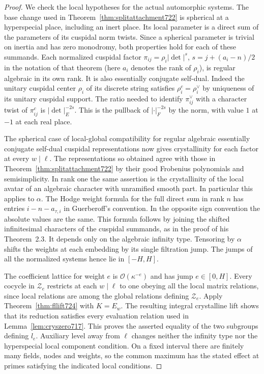 \documentclass[a4paper,11pt]{article}
\theoremstyle{definition}
\theoremstyle{remark}
\numberwithin{equation}{section}
\begin{document}
\begin{proof}
We check the local hypotheses for the actual automorphic systems.
The base change used in Theorem~\ref{thm:splitattachment722} is
spherical at a hyperspecial place, including an inert place.
Its local parameter is a direct sum of the parameters of its cuspidal
norm twists. Since a spherical parameter is trivial on inertia and
has zero monodromy, both properties hold for each of these summands.
Each normalized cuspidal factor
\(\pi_{ij}=\rho_i|\det|^{s}\), \(s=j+(a_i-n)/2\) in the notation of
that theorem (here \(a_i\) denotes the rank of \(\rho_i\)), is regular
algebraic in its own rank. It is also essentially conjugate self-dual.
Indeed the unitary cuspidal center \(\rho_i\) of its discrete string
satisfies \(\rho_i^c=\rho_i^\vee\) by uniqueness of its unitary
cuspidal support. The ratio needed to identify
\(\pi_{ij}^\vee\) with a character twist of \(\pi_{ij}^c\)
is \(|\det|_E^{-2s}\). This is the pullback of \(|\cdot|_F^{-2s}\)
by the norm, with value \(1\) at \(-1\) at each real place.

The spherical case of local-global compatibility for regular algebraic
essentially conjugate self-dual cuspidal representations now gives
crystallinity for each factor at every \(w\mid\ell\).
The representations so obtained agree with those in
Theorem~\ref{thm:splitattachment722} by their good Frobenius
polynomials and semisimplicity. In rank one the same assertion is the
crystallinity of the local avatar of an algebraic character with
unramified smooth part. In particular this applies to \(\alpha\).
The Hodge weight formula for the full direct sum in rank \(n\) has
entries \(i-n-a_{\tau,i}\) in Guerberoff's convention. In the opposite
sign convention the absolute values are the same. This formula follows
by joining the shifted infinitesimal characters of the cuspidal
summands, as in the proof of his Theorem~2.3. It depends only on the
algebraic infinity type. Tensoring by \(\alpha\) shifts the weights at
each embedding by its single filtration jump. The jumps of all the
normalized systems hence lie in \([-H,H]\).
~\cite[Thms.~0.1, 2.2 and proof of Thm.~2.3]{II-II-II-guerberoff724}

The coefficient lattice for weight \(e\) is \(\mathcal O(\kappa^{-e})\)
and has jump \(e\in[0,H]\). Every cocycle in \(\mathcal Z_e\) restricts
at each \(w\mid\ell\) to one obeying all the local matrix relations,
since local relations are among the global relations defining
\(\mathcal Z_e\). Apply Theorem~\ref{thm:fllift724} with \(K=E_w\).
The resulting integral crystalline lift shows that its reduction
satisfies every evaluation relation used in Lemma~\ref{lem:cryszero717}.
This proves the asserted equality of the two subgroups defining \(l_e\).
Auxiliary level away from \(\ell\) changes neither the infinity type nor
the hyperspecial local component condition. On a fixed interval there
are finitely many fields, nodes and weights, so the common maximum has
the stated effect at primes satisfying the indicated local conditions.
\end{proof}
\end{document}
